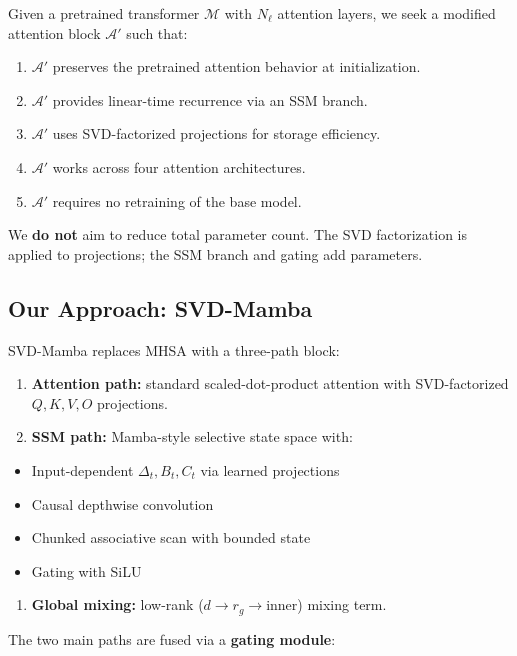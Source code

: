 Given a pretrained transformer $\mathcal{M}$ with $N_\ell$ attention layers, 
we seek a modified attention block $\mathcal{A}'$ such that:

\begin{enumerate}
\item $\mathcal{A}'$ preserves the pretrained attention behavior at initialization.
\item $\mathcal{A}'$ provides linear-time recurrence via an SSM branch.
\item $\mathcal{A}'$ uses SVD-factorized projections for storage efficiency.
\item $\mathcal{A}'$ works across four attention architectures.
\item $\mathcal{A}'$ requires no retraining of the base model.

\end{enumerate}
We \textbf{do not} aim to reduce total parameter count. The SVD factorization 
is applied to projections; the SSM branch and gating add parameters.

\subsection{Our Approach: SVD-Mamba}

SVD-Mamba replaces MHSA with a three-path block:

\begin{enumerate}
\item \textbf{Attention path:} standard scaled-dot-product attention with
  SVD-factorized $Q, K, V, O$ projections.
\item \textbf{SSM path:} Mamba-style selective state space with:
\end{enumerate}
\begin{itemize}
\item Input-dependent $\Delta_t, B_t, C_t$ via learned projections
\item Causal depthwise convolution
\item Chunked associative scan with bounded state
\item Gating with SiLU
\end{itemize}
\begin{enumerate}
\item \textbf{Global mixing:} low-rank ($d \to r_g \to \text{inner}$) mixing term.

\end{enumerate}
The two main paths are fused via a \textbf{gating module}:

